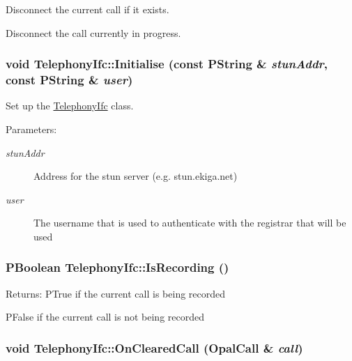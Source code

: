 Disconnect the current call if it exists. 

Disconnect the call currently in progress. \hypertarget{classTelephonyIfc_f9e1672e2302bd86c082070db8cf9b9f}{
\subsubsection[{Initialise}]{\setlength{\rightskip}{0pt plus 5cm}void TelephonyIfc::Initialise (const PString \& {\em stunAddr}, \/  const PString \& {\em user})}}
\label{classTelephonyIfc_f9e1672e2302bd86c082070db8cf9b9f}


Set up the \hyperlink{classTelephonyIfc}{TelephonyIfc} class. 

\begin{Desc}
\item[Parameters:]
\begin{description}
\item[{\em stunAddr}]Address for the stun server (e.g. stun.ekiga.net) \item[{\em user}]The username that is used to authenticate with the registrar that will be used \end{description}
\end{Desc}
\hypertarget{classTelephonyIfc_4acdd44e7af7967ed53cdf9d47dc0c27}{
\subsubsection[{IsRecording}]{\setlength{\rightskip}{0pt plus 5cm}PBoolean TelephonyIfc::IsRecording ()}}
\label{classTelephonyIfc_4acdd44e7af7967ed53cdf9d47dc0c27}


\begin{Desc}
\item[Returns:]PTrue if the current call is being recorded 

PFalse if the current call is not being recorded \end{Desc}
\hypertarget{classTelephonyIfc_7efa2a51fd26f3c5072ee8b7ba09d75c}{
\subsubsection[{OnClearedCall}]{\setlength{\rightskip}{0pt plus 5cm}void TelephonyIfc::OnClearedCall (OpalCall \& {\em call})}}
\label{classTelephonyIfc_7efa2a51fd26f3c5072ee8b7ba09d75c}


